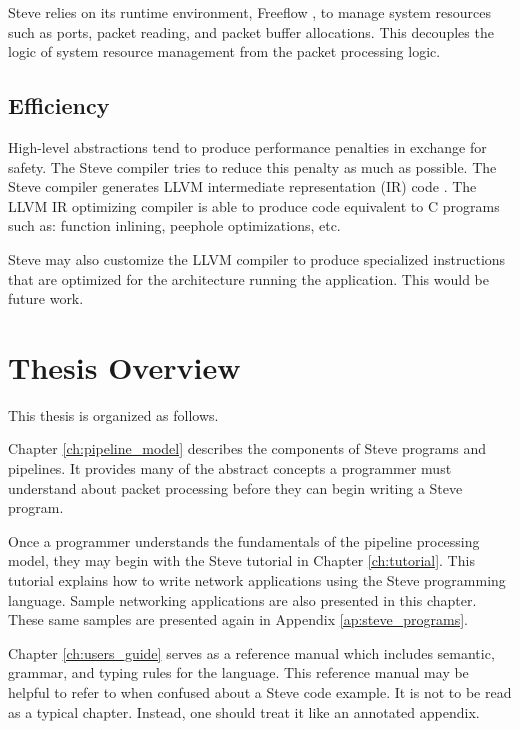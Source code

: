 Steve relies on its runtime environment, Freeflow \cite{freeflow_software}, 
to manage system resources such as
ports, packet reading, and packet buffer allocations.
This decouples the logic of system resource management from the packet
processing logic.

\subsection{Efficiency}


High-level abstractions tend to produce performance penalties in exchange
for safety. The Steve compiler tries to reduce this penalty as much as possible.
The Steve compiler generates LLVM intermediate representation (IR) code
\cite{llvm_webpage}. The LLVM IR optimizing compiler is able to produce 
code equivalent to C programs such as:
function inlining, peephole optimizations, etc.

Steve may also customize the LLVM compiler to produce
specialized instructions that are optimized for the architecture running
the application. This would be future work.

\section{Thesis Overview}

This thesis is organized as follows.

Chapter \ref{ch:pipeline_model} describes the components of Steve programs
and pipelines. It provides many of the abstract concepts a programmer must
understand about packet processing before they can begin writing a Steve
program.

Once a programmer understands the fundamentals of the pipeline processing model,
they may begin with the Steve tutorial in Chapter \ref{ch:tutorial}.
This tutorial explains how to write network applications using the
Steve programming language. Sample networking applications are also presented in
this chapter. These same samples are presented again in Appendix
\ref{ap:steve_programs}. 

Chapter \ref{ch:users_guide} serves as a reference
manual which includes semantic, grammar, and typing rules for the language.
This reference manual may be helpful to refer to when confused about a
Steve code example.
It is not to be read as a typical chapter. Instead, one should 
treat it like an annotated appendix.

